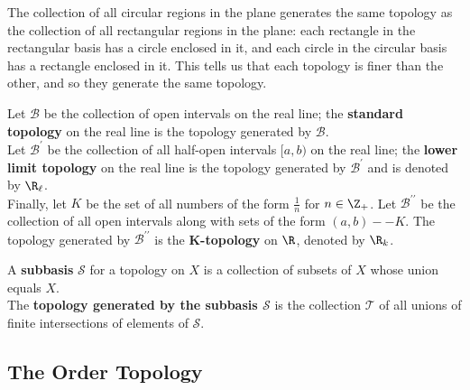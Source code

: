 \begin{remark}
The collection of all circular regions in the plane generates the same topology as the collection of all rectangular regions in the plane:
each rectangle in the rectangular basis has a circle enclosed in it, and each circle in the circular basis has a rectangle enclosed in it. 
This tells us that each topology is finer than the other, and so they generate the same topology.
\end{remark}

\begin{definition}[Topologies on $\R$]
Let $\mathscr{B}$ be the collection of open intervals on the real line; the \textbf{standard topology} on the real line is the topology generated by $\mathscr{B}$. \\

Let $\mathscr{B}^{\prime}$ be the collection of all half-open intervals $[a, b)$ on the real line; the \textbf{lower limit topology} on the real line 
is the topology generated by $\mathscr{B}^{\prime}$ and is denoted by $\R_\ell$. \\

Finally, let $K$ be the set of all numbers of the form $\frac{1}{n}$ for $n \in \Z_+$. Let $\mathscr{B}^{\prime\prime}$ be the collection
of all open intervals along with sets of the form $(a, b) -- K$. The topology generated by $\mathscr{B}^{\prime\prime}$ is the \textbf{K-topology} on $\R$, denoted by $\R_k$.
\end{definition}

\begin{definition}
A \textbf{subbasis} $\mathscr{S}$ for a topology on $X$ is a collection of subsets of $X$ whose union equals $X$. \\

The \textbf{topology generated by the subbasis $\mathscr{S}$} is the collection $\mathscr{T}$ of all unions of finite intersections of elements of $\mathscr{S}$.
\end{definition}

\subsection{The Order Topology}


